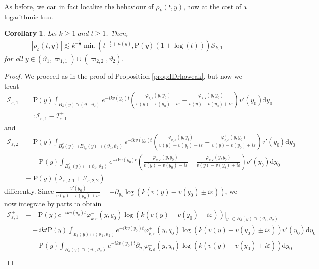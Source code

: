 \documentclass[11pt,reqno]{amsproc}
\newtheorem{corollary}[proposition]{Corollary}
\theoremstyle{definition}
\numberwithin{equation}{section}
\newcommand{\cI}{{\mathcal I}}
\newcommand{\cS}{{\mathcal S}}
\renewcommand{\d}{\mathrm{d}}
\newcommand{\ep}{\varepsilon}
\begin{document}
As before, we can in fact localize the behaviour of $\rho_{k}(t,y)$, now at the cost of a logarithmic loss.

\begin{corollary}\label{cor:improvedIDrhoweak}
Let $k\geq 1$ and $t\geq 1$. Then,
\begin{align*}
\left| \rho_k(t,y) \right| \lesssim k^{-\frac12}\min \left( t^{-\frac12+\mu(y)}, \mathrm{P}(y) (1+\log(t)) \right)\cS_{k,1}
\end{align*}
for all $y\in (\vartheta_1,\varpi_{1,1})\cup (\varpi_{2,2}, \vartheta_2)$.
\end{corollary}

\begin{proof}
We proceed as in the proof of Proposition \ref{prop:IDrhoweak}, but now we treat
\begin{align*}
\cI_{\ep,1}&= \mathrm{P}(y)\int_{B_\delta(y) \cap (\vartheta_1,\vartheta_2)}e^{-ikv(y_0)t}\left( \frac{\varphi_{k,\ep}^-(y,y_0)}{v(y) - v(y_0) - i\ep} - \frac{\varphi_{k,\ep}^+(y,y_0)}{v(y) - v(y_0) + i\ep} \right) v'(y_0) \d y_0\\
&=:\cI_{\ep,1}^- - \cI_{\ep,1}^+
\end{align*}
and
\begin{align*}
\cI_{\ep,2} &= \mathrm{P}(y)\int_{B_\delta^c(y)\cap B_{\delta_0}(y) \cap (\vartheta_1,\vartheta_2)}e^{-ikv(y_0)t}\left( \frac{\varphi_{k,\ep}^-(y,y_0)}{v(y) - v(y_0) - i\ep} - \frac{\varphi_{k,\ep}^+(y,y_0)}{v(y) - v(y_0) + i\ep} \right) v'(y_0) \d y_0 \\
&\quad +\mathrm{P}(y)\int_{B_{\delta_0}^c(y) \cap (\vartheta_1,\vartheta_2)}e^{-ikv(y_0)t}\left( \frac{\varphi_{k,\ep}^-(y,y_0)}{v(y) - v(y_0) - i\ep} - \frac{\varphi_{k,\ep}^+(y,y_0)}{v(y) - v(y_0) + i\ep} \right) v'(y_0) \d y_0 \\
&= \mathrm{P}(y) \left( \cI_{\ep,2,1} + \cI_{\ep,2,2} \right)
\end{align*}
differently. Since $\frac{v'(y_0)}{v(y) - v(y_0) \pm i\ep} = -\partial_{y_0} \log (k(v(y) - v(y_0) \pm i\ep))$, we now integrate by parts to obtain
\begin{align*}
\cI_{\ep,1}^\pm &= -\mathrm{P}(y)e^{-ikv(y_0)t} {\varphi_{k,\ep}^\pm(y,y_0)} \log (k({v(y) - v(y_0) \pm i\ep}))  \Big|_{y_0\in B_\delta(y)\cap (\vartheta_1,\vartheta_2)} \\
&\quad -ikt \mathrm{P}(y)\int_{B_\delta(y)\cap (\vartheta_1,\vartheta_2)}  e^{-ikv(y_0)t}{\varphi_{k,\ep}^\pm(y,y_0)} \log (k({v(y) - v(y_0) \pm i\ep})) v'(y_0) \d y_0 \\
&\quad +\mathrm{P}(y) \int_{B_\delta(y)\cap (\vartheta_1,\vartheta_2)}  e^{-ikv(y_0)t}\partial_{y_0}{\varphi_{k,\ep}^\pm(y,y_0)} \log (k({v(y) - v(y_0) \pm i\ep}))   \d y_0 \\

\end{align*}
\end{proof}
\end{document}
